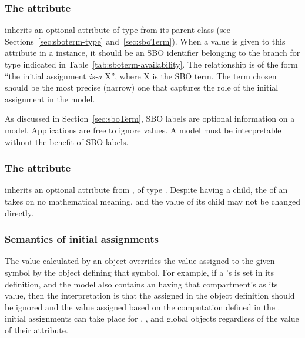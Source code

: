 \subsubsection{The  attribute}
\label{sec:initialassignment-sboterm}

\InitialAssignment inherits an optional 
attribute of type  from its parent
class \SBase (see Sections~\ref{sec:sboterm-type}
and~\ref{sec:sboTerm}).  When a value is given to this
attribute in a \InitialAssignment instance, it should be an
SBO identifier belonging to the branch for type \InitialAssignment  
indicated in Table~\ref{tab:sboterm-availability}.  The relationship is
of the form ``the initial assignment \emph{is-a} X'', where X is
the SBO term.  The term chosen should be the most precise (narrow)
one that captures the role of the initial assignment in the model.

As discussed in Section~\ref{sec:sboTerm}, SBO labels are optional
information on a model.  Applications are free to ignore
 values.  A model must be interpretable without the
benefit of SBO labels.


\begin{blockChanged}
\subsubsection{The  attribute}
\label{sec:initialassignment-id}

\InitialAssignment inherits an optional  attribute from \SBase, of type .  Despite having a  child, the  of an \InitialAssignment takes on no mathematical meaning, and the value of its  child may not be changed directly.
\end{blockChanged}


\subsubsection{Semantics of initial assignments}
\label{sec:initial-assignment-semantics}

The value calculated by an \InitialAssignment object overrides the
value assigned to the given symbol by the object defining that
symbol.  For example, if a \Compartment's  is set in
its definition, and the model also contains an \InitialAssignment
having that compartment's  as its  value,
then the interpretation is that the  assigned in the
\Compartment object definition should be ignored and the value
assigned based on the computation defined in the
\InitialAssignment.   initial assignments can take place for
\Compartment, \Species, \SpeciesReference and global \Parameter
objects regardless of the value of their 
attribute.

